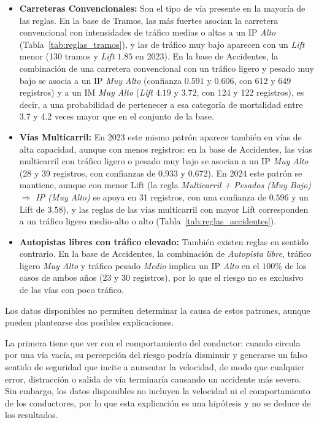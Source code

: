 \documentclass[twoside,a4paper,12pt,onecolumn,openany]{book}
\begin{document}
\begin{itemize}
    \item \textbf{Carreteras Convencionales:} Son el tipo de vía presente en la mayoría de las reglas. En la base de Tramos, las más fuertes asocian la carretera convencional con intensidades de tráfico medias o altas a un IP \textit{Alto} (Tabla~\ref{tab:reglas_tramos}), y las de tráfico muy bajo aparecen con un \textit{Lift} menor (130 tramos y \textit{Lift} $1.85$ en 2023). En la base de Accidentes, la combinación de una carretera convencional con un tráfico ligero y pesado muy bajo se asocia a un IP \textit{Muy Alto} (confianza $0.591$ y $0.606$, con 612 y 649 registros) y a un IM \textit{Muy Alto} (\textit{Lift} $4.19$ y $3.72$, con 124 y 122 registros), es decir, a una probabilidad de pertenecer a esa categoría de mortalidad entre 3.7 y 4.2 veces mayor que en el conjunto de la base.
    
    \item \textbf{Vías Multicarril:} En 2023 este mismo patrón aparece también en vías de alta capacidad, aunque con menos registros: en la base de Accidentes, las vías multicarril con tráfico ligero o pesado muy bajo se asocian a un IP \textit{Muy Alto} (28 y 39 registros, con confianzas de 0.933 y 0.672). En 2024 este patrón se mantiene, aunque con menor Lift (la regla \textit{Multicarril + Pesados (Muy Bajo)} $\Rightarrow$ \textit{IP (Muy Alto)} se apoya en 31 registros, con una confianza de $0.596$ y un Lift de $3.58$), y las reglas de las vías multicarril con mayor Lift corresponden a un tráfico ligero medio-alto o alto (Tabla~\ref{tab:reglas_accidentes}).
    
    \item \textbf{Autopistas libres con tráfico elevado:} También existen reglas en sentido contrario. En la base de Accidentes, la combinación de \textit{Autopista libre}, tráfico ligero \textit{Muy Alto} y tráfico pesado \textit{Medio} implica un IP \textit{Alto} en el $100\%$ de los casos de ambos años (23 y 30 registros), por lo que el riesgo no es exclusivo de las vías con poco tráfico.
\end{itemize}

\vspace{0.5cm}

Los datos disponibles no permiten determinar la causa de estos patrones, aunque pueden plantearse dos posibles explicaciones. 

\vspace{0.5cm}

La primera tiene que ver con el comportamiento del conductor: cuando circula por una vía vacía, su percepción del riesgo podría disminuir y generarse un falso sentido de seguridad que incite a aumentar la velocidad, de modo que cualquier error, distracción o salida de vía terminaría causando un accidente más severo. Sin embargo, los datos disponibles no incluyen la velocidad ni el comportamiento de los conductores, por lo que esta explicación es una hipótesis y no se deduce de los resultados. 
\end{document}
